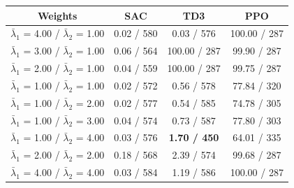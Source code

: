 \begin{tabular}{cccc}
\hline
                       Weights                       &              SAC              &                  TD3                   &     PPO      \\
\hline
 $\bar{\lambda}_1$ = 4.00 / $\bar{\lambda}_2$ = 1.00 & \cellcolor{gray!30}0.02 / 580 &     \cellcolor{gray!30}0.03 / 576      & 100.00 / 287 \\
 $\bar{\lambda}_1$ = 3.00 / $\bar{\lambda}_2$ = 1.00 & \cellcolor{gray!30}0.06 / 564 &              100.00 / 287              & 99.90 / 287  \\
 $\bar{\lambda}_1$ = 2.00 / $\bar{\lambda}_2$ = 1.00 & \cellcolor{gray!30}0.04 / 559 &              100.00 / 287              & 99.75 / 287  \\
 $\bar{\lambda}_1$ = 1.00 / $\bar{\lambda}_2$ = 1.00 & \cellcolor{gray!30}0.02 / 572 &     \cellcolor{gray!30}0.56 / 578      & 77.84 / 320  \\
 $\bar{\lambda}_1$ = 1.00 / $\bar{\lambda}_2$ = 2.00 & \cellcolor{gray!30}0.02 / 577 &     \cellcolor{gray!30}0.54 / 585      & 74.78 / 305  \\
 $\bar{\lambda}_1$ = 1.00 / $\bar{\lambda}_2$ = 3.00 & \cellcolor{gray!30}0.04 / 574 &     \cellcolor{gray!30}0.73 / 587      & 77.80 / 303  \\
 $\bar{\lambda}_1$ = 1.00 / $\bar{\lambda}_2$ = 4.00 & \cellcolor{gray!30}0.03 / 576 & \cellcolor{gray!30}\textbf{1.70 / 450} & 64.01 / 335  \\
 $\bar{\lambda}_1$ = 2.00 / $\bar{\lambda}_2$ = 2.00 & \cellcolor{gray!30}0.18 / 568 &     \cellcolor{gray!30}2.39 / 574      & 99.68 / 287  \\
 $\bar{\lambda}_1$ = 4.00 / $\bar{\lambda}_2$ = 4.00 & \cellcolor{gray!30}0.03 / 584 &     \cellcolor{gray!30}1.19 / 586      & 100.00 / 287 \\
\hline
\end{tabular}